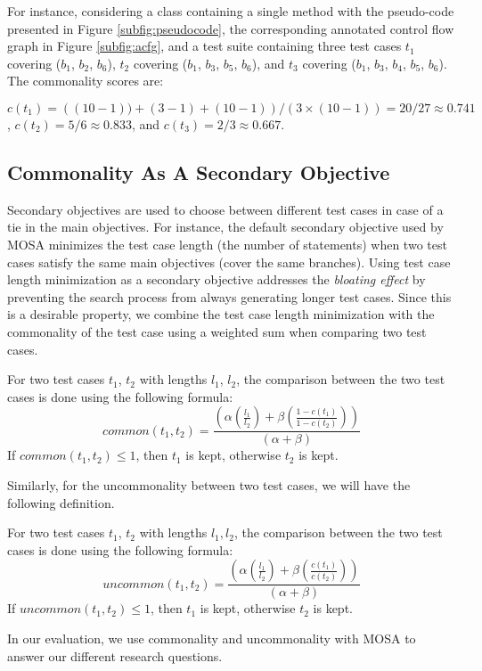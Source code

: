 For instance, considering a class containing a single method with the pseudo-code presented in Figure \ref{subfig:pseudocode}, the corresponding annotated control flow graph in Figure \ref{subfig:acfg}, and a test suite containing three test cases $t_1$ covering ($b_1$, $b_2$, $b_6$), $t_2$ covering ($b_1$, $b_3$, $b_5$, $b_6$), and $t_3$ covering ($b_1$, $b_3$, $b_4$, $b_5$, $b_6$). The commonality scores are:


$c(t_1) = \left( (10-1))+ (3-1) + (10-1) \right)/\left(3 \times (10 - 1)\right) = 20/27 \approx 0.741$, 
$c(t_2) = 5/6 \approx 0.833$, and 
$c(t_3) = 2/3 \approx 0.667$.


\subsection{Commonality As A Secondary Objective}

Secondary objectives are used to choose between different test cases in case of a tie in the main objectives. For instance, the default secondary objective used by MOSA \cite{Panichella2015} minimizes the test case length (\ie the number of statements) when two test cases satisfy the same main objectives (\eg cover the same branches). Using test case length minimization as a secondary objective addresses the \emph{bloating effect} \cite{Silva2012} by preventing the search process from always generating longer test cases. Since this is a desirable property, we combine the test case length minimization with the commonality of the test case using a weighted sum when comparing two test cases. 
%
\begin{definition}\label{def:common}
    For two test cases $t_1$, $t_2$ with lengths $l_1$, $l_2$, the comparison between the two test cases is done using the following formula: 
    $$\textit{common}(t_1,t_2) = \frac{\left( 
        \alpha \left( \frac{l_1}{l_2} \right) +
        \beta \left( \frac{1 - c(t_1)}{1 - c(t_2)} \right)
    \right)}{\left(\alpha + \beta \right)} $$
    If $\textit{common}(t_1,t_2) \leq 1$, then $t_1$ is kept, otherwise $t_2$ is kept. 
\end{definition}
%
Similarly, for the uncommonality between two test cases, we will have the following definition.
%
\begin{definition}\label{def:uncommon}
    For two test cases $t_1$, $t_2$ with lengths $l_1, l_2$, the comparison between the two test cases is done using the following formula: 
    $$\textit{uncommon}(t_1,t_2) = \frac{\left( 
        \alpha \left( \frac{l_1}{l_2} \right) +
        \beta \left( \frac{c(t_1)}{c(t_2)} \right)
    \right)}{\left(\alpha + \beta \right)} $$
    If $\textit{uncommon}(t_1,t_2) \leq 1$, then $t_1$ is kept, otherwise $t_2$ is kept. 
\end{definition}
%
In our evaluation, we use commonality and uncommonality with MOSA to answer our different research questions. 
